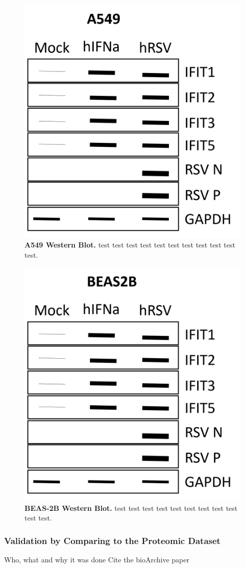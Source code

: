 \begin{figure}
    \centering
    \includegraphics[width=0.5\linewidth]{06. Chapter 1/Figs/02. Expression/02. A549 WB.png}
    \caption[A549 Western Blot.]{\textbf{A549 Western Blot.} test test test test test test test test test test test.}
    \label{A549 Western Blot.}
\end{figure}

\begin{figure}
    \centering
    \includegraphics[width=0.5\linewidth]{06. Chapter 1/Figs/02. Expression/03. beas2b wb.png}
    \caption[BEAS-2B Western Blot.]{\textbf{BEAS-2B Western Blot.} test test test test test test test test test test test.}
    \label{BEAS-2B Western Blot.}
\end{figure}

\subsubsection{Validation by Comparing to the Proteomic Dataset} \label{Validation by Comparing to the Proteomic Dataset}
Who, what and why it was done  \newline
Cite the bioArchive paper \cite{Jobe2023ViralCondensates}

